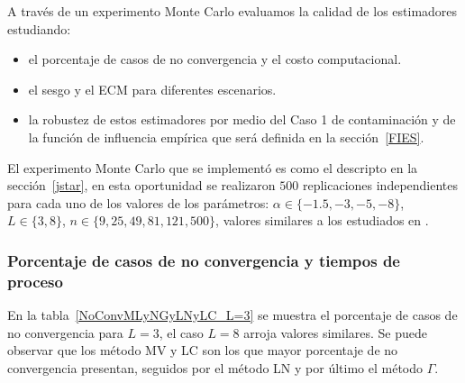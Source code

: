 A través de un experimento Monte Carlo evaluamos la calidad de los estimadores estudiando:
\begin{itemize}
	\item el porcentaje de casos de no convergencia y el costo computacional.
	\item el sesgo y el ECM para diferentes escenarios.
	\item la robustez de estos estimadores por medio del Caso 1 de contaminación y de la función de influencia empírica que será definida en la sección~\ref{FIES}.
\end{itemize} 

El experimento Monte Carlo que se implementó es como el descripto en la sección~\ref{jstar}, en esta oportunidad se realizaron $500$ replicaciones independientes para cada uno de los valores de los parámetros: 
$\alpha\in\{-1.5, -3, -5, -8\}$, $L\in\{3,8\}$, $n\in\{9, 25,49, 81,121,500\}$, valores similares a los estudiados en \citet{gambini2015}. 

\subsubsection{Porcentaje de casos de no convergencia y tiempos de proceso}
En la tabla~\ref{NoConvMLyNGyLNyLC_L=3} se muestra el porcentaje de casos de no convergencia para $L=3$, el caso $L=8$ arroja valores similares. Se puede observar que los método MV y LC son los que mayor porcentaje de no convergencia presentan, seguidos por el método LN y por último el método $\Gamma$. 

